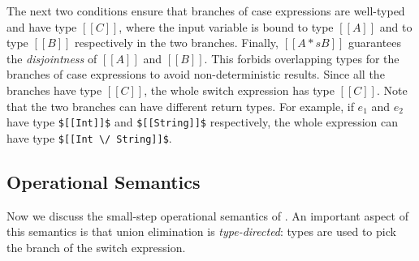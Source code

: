 The next two conditions ensure that
branches of case expressions are well-typed and have type
$[[C]]$,
where the input variable is bound to type $[[A]]$ and to
type $[[B]]$ respectively in the two branches.
Finally,
$[[A *s B]]$ guarantees the \emph{disjointness} of $[[A]]$ and $[[B]]$.
This forbids overlapping types for the branches of case expressions
to avoid non-deterministic results.
Since all the branches have type $[[C]]$, the whole
switch expression has type $[[C]]$.
Note that the two branches can have different return types.
For example, if $e_1$ and $e_2$ have type \lstinline{$[[Int]]$}
and \lstinline{$[[String]]$} respectively,
the whole expression can have type \lstinline{$[[Int \/ String]]$}.


\subsection{Operational Semantics}
\label{sec:union:os}
Now we discuss the small-step operational semantics of \name.
An important aspect of this semantics is that union elimination is \textit{type-directed}:
types are used to pick the branch of the switch expression.


